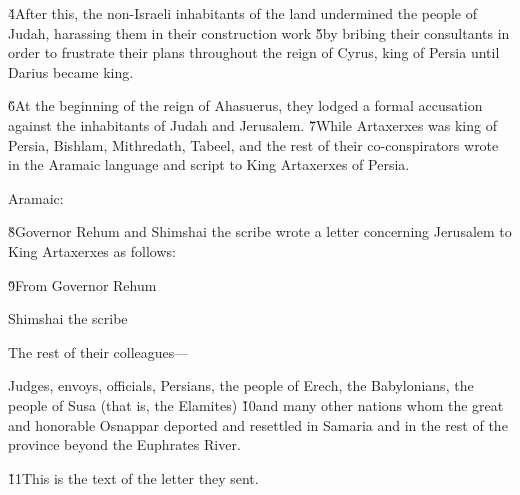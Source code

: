 \v{4}After this, the non-Israeli inhabitants of the land undermined the people of Judah, harassing them in their construction work \v{5}by bribing their consultants in order to frustrate their plans throughout the reign of Cyrus, king of Persia until Darius became king.

\v{6}At the beginning of the reign of Ahasuerus, they lodged a formal accusation against the inhabitants of Judah and Jerusalem. \v{7}While Artaxerxes was king of Persia, Bishlam, Mithredath, Tabeel, and the rest of their co-conspirators wrote in the Aramaic language and script to King Artaxerxes of Persia.

Aramaic:

\v{8}Governor Rehum and Shimshai the scribe wrote a letter concerning Jerusalem to King Artaxerxes as follows:

\v{9}From Governor Rehum

Shimshai the scribe

The rest of their colleagues---

Judges, envoys, officials, Persians, the people of Erech, the Babylonians, the people of Susa (that is, the Elamites) \v{10}and many other nations whom the great and honorable Osnappar deported and resettled in Samaria and in the rest of the province beyond the Euphrates River.

\v{11}This is the text of the letter they sent.

